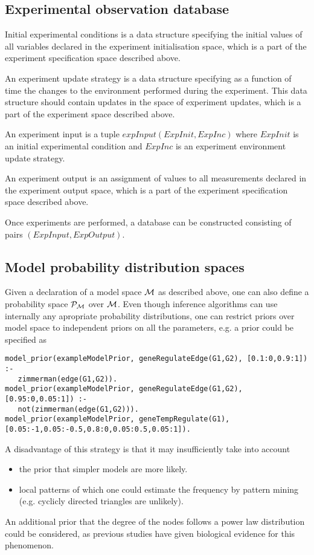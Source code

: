 \documentclass{article}
\begin{document}
\subsection{Experimental observation database}

Initial experimental conditions is a data structure specifying the initial values of all variables declared in the experiment initialisation space, which is a part of the experiment specification space described above.

An experiment update strategy is a data structure specifying as a function of time the changes to the environment performed during the experiment.  This data structure should contain updates in the space of experiment updates, which is a part of the experiment space described above.

An experiment input is a tuple $expInput(ExpInit,ExpInc)$
where $ExpInit$ is an initial experimental condition
and $ExpInc$ is an experiment environment update strategy.

An experiment output is an assignment of values to all measurements declared in the experiment output space, which is a part of the experiment specification space described above.

Once experiments are performed, a database can be constructed consisting of
pairs $(ExpInput,ExpOutput)$.

\subsection{Model probability distribution spaces}
\label{sec:modProbDist}
Given a declaration of a model space $\mathcal{M}$ as described above, one can also define a probability space $\mathcal{P}_\mathcal{M}$ over $\mathcal{M}$.
Even though inference algorithms can use internally any apropriate
probability distributions, one can restrict priors over model space
to independent priors on all the parameters, e.g. a prior could be specified as

\begin{verbatim}
model_prior(exampleModelPrior, geneRegulateEdge(G1,G2), [0.1:0,0.9:1]) :- 
   zimmerman(edge(G1,G2)).
model_prior(exampleModelPrior, geneRegulateEdge(G1,G2), [0.95:0,0.05:1]) :- 
   not(zimmerman(edge(G1,G2))).
model_prior(exampleModelPrior, geneTempRegulate(G1), [0.05:-1,0.05:-0.5,0.8:0,0.05:0.5,0.05:1]).
\end{verbatim}

A disadvantage of this strategy is that it may insufficiently take into account
\begin{itemize}
\item the prior that simpler models are more likely.
\item local patterns of which one could estimate the frequency by pattern mining (e.g. cyclicly directed triangles are unlikely).
\end{itemize}
An additional prior that the degree of the nodes follows a power law distribution could be considered, as previous studies have given biological evidence for this phenomenon.
\end{document}
